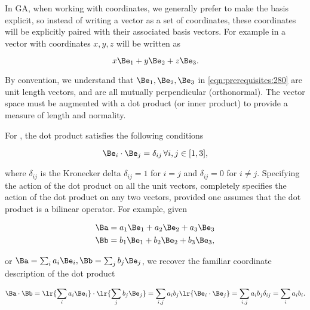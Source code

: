 In GA, when working with coordinates, we generally prefer to make the basis explicit, so instead of writing a vector as a set of coordinates, these coordinates
will be explicitly paired with their associated basis vectors.
For example in  a vector with coordinates \( x, y, z \) will be written as

\begin{dmath}\label{eqn:prerequisites:280}
x \Be_1 + y \Be_2 + z \Be_3.
\end{dmath}

By convention, we understand that \( \Be_1, \Be_2, \Be_3 \) in \cref{eqn:prerequisites:280} are unit length vectors, and are all mutually perpendicular (orthonormal).
The vector space must be augmented with a dot product (or inner product) to provide a measure of length and normality.  


For , the dot product satisfies the following conditions

\begin{equation}\label{eqn:prerequisites:320}
\Be_i \cdot \Be_j = \delta_{ij} \, \forall i, j \in [1,3],
\end{equation}

where \( \delta_{ij} \) is the Kronecker delta \( \delta_{ij} = 1 \) for \( i = j \) and \( \delta_{ij} = 0 \) for \( i \ne j \).
Specifying the action of the dot product on all the unit vectors, completely specifies the action of the dot product on any two vectors, provided one assumes that the dot product is a bilinear operator.
For example, given

\begin{dmath}\label{eqn:prerequisites:340}
\begin{aligned}
\Ba &= a_1 \Be_1 + a_2 \Be_2 + a_3 \Be_3 \\
\Bb &= b_1 \Be_1 + b_2 \Be_2 + b_3 \Be_3,
\end{aligned}
\end{dmath}

or \( \Ba = \sum_i a_i \Be_i, \Bb = \sum_j b_j \Be_j \), we recover the familiar coordinate description of the dot product

\begin{dmath}\label{eqn:prerequisites:360}
\Ba \cdot \Bb
=
\lr{ \sum_i a_i \Be_i } \cdot \lr{ \sum_j b_j \Be_j }
=
\sum_{i,j} a_i b_j \lr{ \Be_i \cdot \Be_j }
=
\sum_{i,j} a_i b_j \delta_{ij}
=
\sum_{i} a_i b_i.
\end{dmath}

